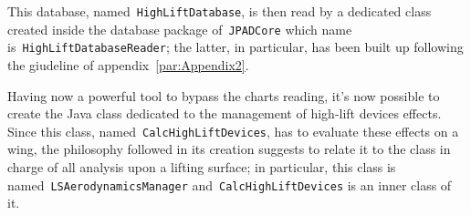 \bigskip
\noindent
This database, named~\lstinline[language=Java]!HighLiftDatabase!, is then read by a dedicated class created inside the database package of~\lstinline[language=Java]!JPADCore! which name is~\lstinline[language=Java]!HighLiftDatabaseReader!; the latter, in particular, has been built up following the giudeline of appendix~\ref{par:Appendix2}.

\bigskip
\noindent
Having now a powerful tool to bypass the charts reading, it's now possible to create the Java class dedicated to the management of high-lift devices effects. Since this class, named~\lstinline[language=Java]!CalcHighLiftDevices!, has to evaluate these effects on a wing, the philosophy followed in its creation suggests to relate it to the class in charge of all analysis upon a lifting surface; in particular, this class is named~\lstinline[language=Java]!LSAerodynamicsManager! and~\lstinline[language=Java]!CalcHighLiftDevices! is an inner class of it.

